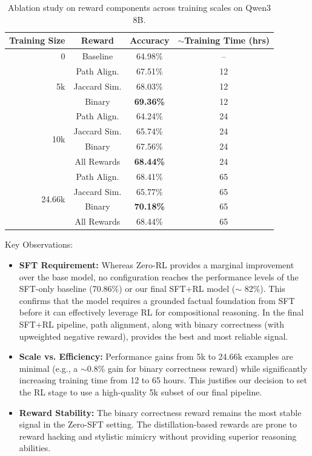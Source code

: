 \documentclass{article}
\theoremstyle{plain}
\theoremstyle{definition}
\theoremstyle{remark}
\begin{document}
\begin{table}[ht]
\caption{Ablation study on reward components across training scales on Qwen3 8B.}
\label{tab:reward_ablation}
\vskip 0.15in
\begin{center}
\begin{small}
\begin{sc}
\begin{tabular}{rccc}
\toprule
Training Size & Reward & Accuracy & $\sim$Training Time (hrs) \\
\midrule
0 & Baseline & 64.98\% & -- \\
\midrule
\multirow{3}{*}{5k} 
  & Path Align. & 67.51\% & 12 \\
  & Jaccard Sim. & 68.03\% & 12 \\
  & Binary & \textbf{69.36\%} & 12 \\
\midrule
\multirow{4}{*}{10k} 
  & Path Align. & 64.24\% & 24 \\
  & Jaccard Sim. & 65.74\% & 24 \\
  & Binary & 67.56\% & 24 \\
  & All Rewards & \textbf{68.44\%} & 24 \\
\midrule
\multirow{4}{*}{24.66k} 
  & Path Align. & 68.41\% & 65 \\
  & Jaccard Sim. & 65.77\% & 65 \\
  & Binary & \textbf{70.18\%} & 65 \\
  & All Rewards & 68.44\% & 65 \\
\bottomrule
\end{tabular}
\end{sc}
\end{small}
\end{center}
\vskip -0.1in
\end{table}

Key Observations:
\begin{itemize}
    \item \textbf{SFT Requirement:} Whereas Zero-RL provides a marginal improvement over the base model, no configuration reaches the performance levels of the SFT-only baseline (70.86\%) or our final SFT+RL model ($\sim$ 82\%). This confirms that the model requires a grounded factual foundation from SFT before it can effectively leverage RL for compositional reasoning. In the final SFT+RL pipeline, path alignment, along with binary correctness (with upweighted negative reward), provides the best and most reliable signal.

    \item \textbf{Scale vs. Efficiency:} Performance gains from 5k to 24.66k examples are minimal (e.g., a $\sim$0.8\% gain for binary correctness reward) while significantly increasing training time from 12 to 65 hours. This justifies our decision to set the RL stage to use a high-quality 5k subset of our final pipeline.

    \item \textbf{Reward Stability:} The binary correctness reward remains the most stable signal in the Zero-SFT setting. The distillation-based rewards are prone to reward hacking and stylistic mimicry without providing superior reasoning abilities.
\end{itemize}
\end{document}
